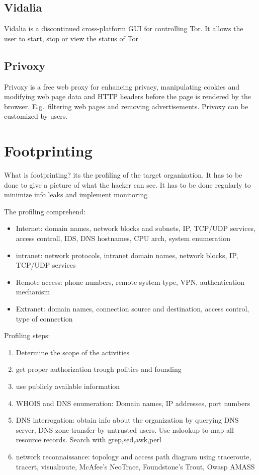 \subsection{Vidalia}
Vidalia is a discontinued cross-platform GUI for controlling Tor.
It allows the user to start, stop or view the status of Tor

\subsection{Privoxy}
Privoxy is a free web proxy for enhancing
privacy, manipulating cookies and
modifying web page data and HTTP headers
before the page is rendered by the browser.
E.g.\ filtering web pages and removing
advertisements. Privoxy can be customized by
users.

\section{Footprinting}
What is footprinting? its the profiling of the target organization. It has to be done to give a picture of what the hacker can see. It has to be done regularly to minimize info leaks and implement monitoring

The profiling comprehend: 
\begin{itemize}
    \item Internet: domain names, network blocks and subnets, IP, TCP/UDP services, access controll, IDS, DNS hostnames, CPU arch, system enumeration
    \item intranet: network protocols, intranet domain names, network blocks, IP, TCP/UDP services
    \item Remote access: phone numbers, remote system type, VPN, authentication mechanism
    \item Extranet: domain names, connection source and destination, access control, type of connection
\end{itemize}

Profiling steps:
\begin{enumerate}
    \item Determine the scope of the activities
    \item get proper authorization trough politics and founding
    \item use publicly available information
    \item WHOIS and DNS enumeration: Domain names, IP addresses, port numbers
    \item DNS interrogation: obtain info about the organization by querying DNS server, DNS zone transfer by untrusted users. Use nslookup to map all resource records. Search with grep,sed,awk,perl
    \item network reconnaissance: topology and access path diagram using traceroute, tracert, visualroute, McAfee’s
NeoTrace, Foundstone’s Trout, Owasp
AMASS

\end{enumerate}

